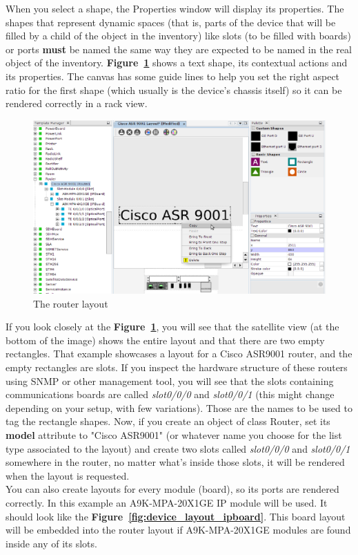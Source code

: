 \documentclass[a4paper]{article}
\begin{document}
	When you select a shape, the Properties window will display its properties. The shapes that represent dynamic spaces (that is, parts of the device that will be filled by a child of the object in the inventory) like slots (to be filled with boards) or ports \textbf{must} be named the same way they are expected to be named in the real object of the inventory. \textbf{Figure~\ref{fig:device_layout_edited}} shows a text shape, its contextual actions and its properties. The canvas has some guide lines to help you set the right aspect ratio for the first shape (which usually is the device's chassis itself) so it can be rendered correctly in a rack view.
	
	\begin{figure}[h!]
		\centering
		\includegraphics[width=0.9\linewidth]{img/device_layout_edited.png}
		\caption{The router layout}
		\label{fig:device_layout_edited}
	\end{figure}
	\newpage
	If you look closely at the \textbf{Figure~\ref{fig:device_layout_edited}}, you will see that the satellite view (at the bottom of the image) shows the entire layout and that there are two empty rectangles. That example showcases a layout for a Cisco ASR9001 router, and the empty rectangles are slots. If you inspect the hardware structure of these routers using SNMP or other management tool, you will see that the slots containing communications boards are called \textit{slot0/0/0} and \textit{slot0/0/1} (this might change depending on your setup, with few variations). Those are the names to be used to tag the rectangle shapes. Now, if you create an object of class Router, set its \textbf{model} attribute to "Cisco ASR9001" (or whatever name you choose for the list type associated to the layout) and create two slots called \textit{slot0/0/0} and \textit{slot0/0/1} somewhere in the router, no matter what's inside those slots, it will be rendered when the layout is requested.\\
	\newline
	You can also create layouts for every module (board), so its ports are rendered correctly. In this example an A9K-MPA-20X1GE IP module will be used. It should look like the \textbf{Figure~\ref{fig:device_layout_ipboard}}. This board layout will be embedded into the router layout if A9K-MPA-20X1GE modules are found inside any of its slots.
	
\end{document}
